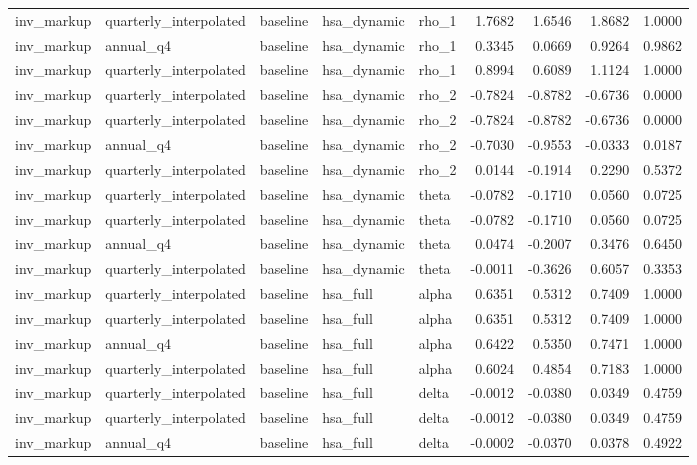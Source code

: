 \begin{tabular}{lllllrrrr}
inv\_markup & quarterly\_interpolated & baseline & hsa\_dynamic & rho\_1 & 1.7682 & 1.6546 & 1.8682 & 1.0000 \\
inv\_markup & annual\_q4 & baseline & hsa\_dynamic & rho\_1 & 0.3345 & 0.0669 & 0.9264 & 0.9862 \\
inv\_markup & quarterly\_interpolated & baseline & hsa\_dynamic & rho\_1 & 0.8994 & 0.6089 & 1.1124 & 1.0000 \\
inv\_markup & quarterly\_interpolated & baseline & hsa\_dynamic & rho\_2 & -0.7824 & -0.8782 & -0.6736 & 0.0000 \\
inv\_markup & quarterly\_interpolated & baseline & hsa\_dynamic & rho\_2 & -0.7824 & -0.8782 & -0.6736 & 0.0000 \\
inv\_markup & annual\_q4 & baseline & hsa\_dynamic & rho\_2 & -0.7030 & -0.9553 & -0.0333 & 0.0187 \\
inv\_markup & quarterly\_interpolated & baseline & hsa\_dynamic & rho\_2 & 0.0144 & -0.1914 & 0.2290 & 0.5372 \\
inv\_markup & quarterly\_interpolated & baseline & hsa\_dynamic & theta & -0.0782 & -0.1710 & 0.0560 & 0.0725 \\
inv\_markup & quarterly\_interpolated & baseline & hsa\_dynamic & theta & -0.0782 & -0.1710 & 0.0560 & 0.0725 \\
inv\_markup & annual\_q4 & baseline & hsa\_dynamic & theta & 0.0474 & -0.2007 & 0.3476 & 0.6450 \\
inv\_markup & quarterly\_interpolated & baseline & hsa\_dynamic & theta & -0.0011 & -0.3626 & 0.6057 & 0.3353 \\
inv\_markup & quarterly\_interpolated & baseline & hsa\_full & alpha & 0.6351 & 0.5312 & 0.7409 & 1.0000 \\
inv\_markup & quarterly\_interpolated & baseline & hsa\_full & alpha & 0.6351 & 0.5312 & 0.7409 & 1.0000 \\
inv\_markup & annual\_q4 & baseline & hsa\_full & alpha & 0.6422 & 0.5350 & 0.7471 & 1.0000 \\
inv\_markup & quarterly\_interpolated & baseline & hsa\_full & alpha & 0.6024 & 0.4854 & 0.7183 & 1.0000 \\
inv\_markup & quarterly\_interpolated & baseline & hsa\_full & delta & -0.0012 & -0.0380 & 0.0349 & 0.4759 \\
inv\_markup & quarterly\_interpolated & baseline & hsa\_full & delta & -0.0012 & -0.0380 & 0.0349 & 0.4759 \\
inv\_markup & annual\_q4 & baseline & hsa\_full & delta & -0.0002 & -0.0370 & 0.0378 & 0.4922 \\

\end{tabular}
